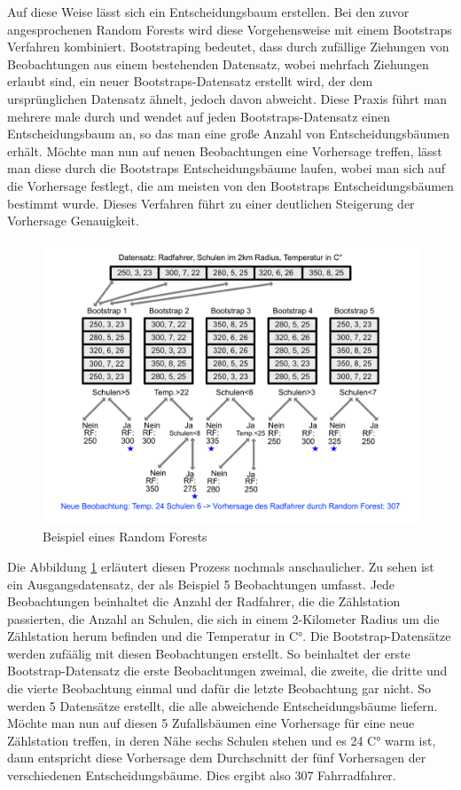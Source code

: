 \documentclass[a4paper,12pt]{thesis}
\begin{document}
Auf diese Weise lässt sich ein Entscheidungsbaum erstellen. Bei den zuvor angesprochenen Random Forests wird diese Vorgehensweise mit einem Bootstraps Verfahren kombiniert. Bootstraping bedeutet, dass durch zufällige Ziehungen von Beobachtungen aus einem bestehenden Datensatz, wobei mehrfach Ziehungen erlaubt sind, ein neuer Bootstraps-Datensatz erstellt wird, der dem ursprünglichen Datensatz ähnelt, jedoch davon abweicht. Diese Praxis führt man mehrere male durch und wendet auf jeden Bootstraps-Datensatz einen Entscheidungsbaum an, so das man eine große Anzahl von Entscheidungsbäumen erhält. Möchte man nun auf neuen Beobachtungen eine Vorhersage treffen, lässt man diese durch die Bootstraps Entscheidungsbäume laufen, wobei man sich auf die Vorhersage festlegt, die am meisten von den Bootstraps Entscheidungsbäumen bestimmt wurde. Dieses Verfahren führt zu einer deutlichen Steigerung der Vorhersage Genauigkeit.

\begin{figure}[!ht]
	\centering
	\includegraphics[width=14cm]{Plots/Random_Forests.png}
	\caption{Beispiel eines Random Forests}
	\label{RF2}
\end{figure}

Die Abbildung \ref{RF2} erläutert diesen Prozess nochmals anschaulicher. Zu sehen ist ein Ausgangsdatensatz, der als Beispiel 5 Beobachtungen umfasst. Jede Beobachtungen beinhaltet die Anzahl der Radfahrer, die die Zählstation passierten, die Anzahl an Schulen, die sich in einem 2-Kilometer Radius um die Zählstation herum befinden und die Temperatur in C°. Die Bootstrap-Datensätze werden zufäälig mit diesen Beobachtungen erstellt. So beinhaltet der erste Bootstrap-Datensatz die erste Beobachtungen zweimal, die zweite, die dritte und die vierte Beobachtung einmal und dafür die letzte Beobachtung gar nicht. So werden 5 Datensätze erstellt, die alle abweichende Entscheidungsbäume liefern. Möchte man nun auf diesen 5 Zufallsbäumen eine Vorhersage für eine neue Zählstation treffen, in deren Nähe sechs Schulen stehen und es 24 C° warm ist, dann entspricht diese Vorhersage dem Durchschnitt der fünf Vorhersagen der verschiedenen Entscheidungsbäume. Dies ergibt also 307 Fahrradfahrer.
\end{document}
